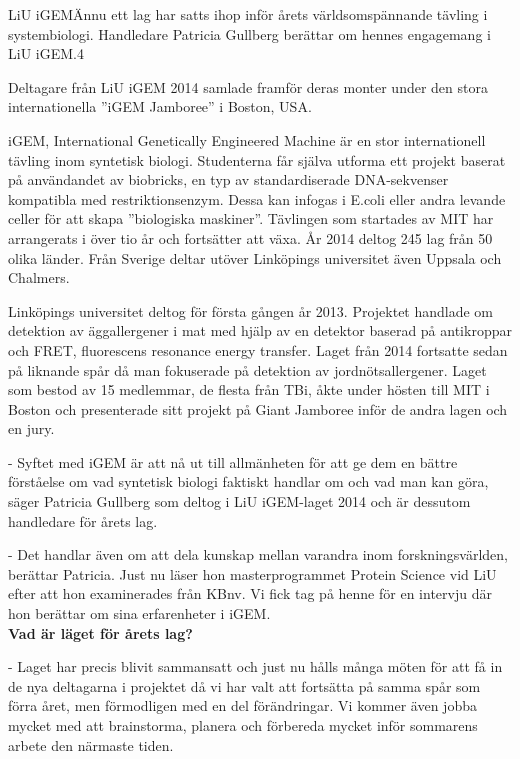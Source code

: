 \begin{news}{3}{LiU iGEM}{Ännu ett lag
  har satts ihop inför årets världsomspännande tävling i
  systembiologi. Handledare Patricia Gullberg berättar om hennes
  engagemang i LiU iGEM.}{}{4}{}

     {Deltagare från LiU iGEM 2014 samlade
     framför deras monter under den stora internationella ”iGEM
     Jamboree” i Boston, USA.}
     
  iGEM, International Genetically Engineered Machine är en stor
  internationell tävling inom syntetisk biologi. Studenterna får
  själva utforma ett projekt baserat på användandet av biobricks, en
  typ av standardiserade DNA-sekvenser kompatibla med
  restriktionsenzym. Dessa kan infogas i E.coli eller andra levande
  celler för att skapa ”biologiska maskiner”. Tävlingen som startades
  av MIT har arrangerats i över tio år och fortsätter att växa. År
  2014 deltog 245 lag från 50 olika länder. Från Sverige deltar utöver
  Linköpings universitet även Uppsala och Chalmers.

  Linköpings universitet deltog för första gången år 2013. Projektet
  handlade om detektion av äggallergener i mat med hjälp av en
  detektor baserad på antikroppar och FRET, fluorescens resonance
  energy transfer. Laget från 2014 fortsatte sedan på liknande spår då
  man fokuserade på detektion av jordnötsallergener. Laget som bestod
  av 15 medlemmar, de flesta från TBi, åkte under hösten till MIT i Boston
  och presenterade sitt projekt på Giant Jamboree inför de andra lagen och en
  jury.


  - Syftet med iGEM är att nå ut till allmänheten för att ge dem en
  bättre förståelse om vad syntetisk biologi faktiskt handlar om och
  vad man kan göra, säger Patricia Gullberg som deltog i LiU
  iGEM-laget 2014 och är dessutom handledare för årets lag.

  - Det handlar även om att dela kunskap mellan varandra inom
  forskningsvärlden, berättar Patricia. Just nu läser hon
  masterprogrammet Protein Science vid LiU efter att hon examinerades
  från KBnv. Vi fick tag på henne för en intervju där hon berättar om
  sina erfarenheter i iGEM.
\\

 \noindent \textbf{Vad är läget för årets lag?}

  - Laget har precis blivit
  sammansatt och just nu hålls många möten för att få in de nya
  deltagarna i projektet då vi har valt att fortsätta på samma spår
  som förra året, men förmodligen med en del förändringar. Vi kommer
  även jobba mycket med att brainstorma, planera och förbereda mycket
  inför sommarens arbete den närmaste tiden.
\\


\end{news}
